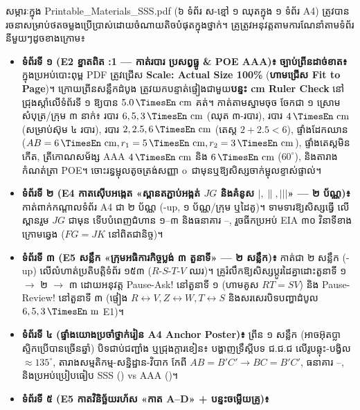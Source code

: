 \documentclass[a4paper,12pt]{article}
\newcommand{\en}[1]{{\TimesEn #1}}
\newcommand{\unit}[1]{\,\text{\en{#1}}}
\newcommand{\cnum}[1]{\text{\fontsize{10.5pt}{12pt}\selectfont\ding{\numexpr181+#1\relax}}}
\newcommand{\wcirc}{{\CourierBullet\fontsize{9.5pt}{11pt}\selectfont o}}
\begin{document}
សម្ភារៈក្នុង \en{Printable\_Materials\_SSS.pdf} (៦ ទំព័រ ស-ខ្មៅ ១ ឈុតក្នុង ១ ទំព័រ \en{A4}) ត្រូវបានរចនាសម្រាប់ថតចម្លងប្រើប្រាស់ដោយចំណាយតិចបំផុតក្នុងថ្នាក់។ គ្រូត្រូវអនុវត្តតាមការណែនាំតាមទំព័រនីមួយៗដូចខាងក្រោម៖

\begin{itemize}[leftmargin=0.55cm, topsep=1pt, itemsep=1.5pt, parsep=0pt]
  \item \textbf{ទំព័រទី ១ (\en{E2} ខ្នាតពិត \en{1:1} — កាត់របារ ប្រសព្វធ្នូ \& \en{POE AAA})៖}
    \textbf{ច្បាប់ព្រីនដាច់ខាត៖} ក្នុងប្រអប់បោះពុម្ព \en{PDF} ត្រូវជ្រើស \textbf{\en{Scale: Actual Size 100\%}} (\textbf{ហាមជ្រើស \en{Fit to Page}})។ ក្រោយព្រីនសន្លឹកដំបូង ត្រូវយកបន្ទាត់ផ្ទៀងជាមួយ\textbf{បន្ទះ \en{5 cm Ruler Check}} នៅជ្រុងស្ដាំលើទំព័រទី ១ ឱ្យបាន $5.0\unit{cm}$ គត់។ កាត់តាមស្នាមចុច  ចែកជា ១ ស្រោមសំបុត្រ/ក្រុម ៣ នាក់៖ របារ $6, 5, 3\unit{cm}$ (ឈុត ៣-របារ), របារ $4\unit{cm}$ (សម្រាប់ស៊ុម ៤ របារ), របារ $2, 2.5, 6\unit{cm}$ (តេស្ត $2+2.5<6$), ផ្ទាំងដែកឈាន ($AB=6\unit{cm}, r_1=5\unit{cm}, r_2=3\unit{cm}$), ផ្ទាំងតេស្តមិនកើត, ត្រីកោណសម័ង្ស \en{AAA} $4\unit{cm}$ និង $6\unit{cm}$ ($60^\circ$), និងតារាងកំណត់ត្រា \en{POE}។ ចោះរន្ធម្ជុលតូចត្រង់សញ្ញា \wcirc\ ជាមុនឬឱ្យសិស្សចាក់ម្ជុលខ្ទាស់ផ្ទាល់។
  \item \textbf{ទំព័រទី ២ (\en{E4} កាតស៊ើបអង្កេត «ស្ពានតភ្ជាប់អង្កត់ $JG$ និងគំនូស $|, \parallel, |||$» — ២ ប័ណ្ណ)៖}
    កាត់ពាក់កណ្ដាលទំព័រ \en{A4} ជា ២ ប័ណ្ណ (\en{2-up}, ១ ប័ណ្ណ/ក្រុម ឬដៃគូ)។ ទាមទារឱ្យសិស្សធ្វើ \en{[tracing]} លើស្ពានរួម $JG$ ជាមុន ទើបបំពេញជំហាន ១--៣ និងធនាគារ \cnum{1}--\cnum{5}, រួចធីកប្រអប់ \en{EIA} ៣០ វិនាទីខាងក្រោមឆ្វេង ($FG=JK$ នៅពិតជានិច្ច)។
  \item \textbf{ទំព័រទី ៣ (\en{E5} សន្លឹក «ក្រុមអធិការកិច្ចប្លង់ ៣ តួនាទី» — ២ សន្លឹក)៖}
    កាត់ជា ២ សន្លឹក (\en{2-up}) លើលំហាត់ប្រតិបត្តិទំព័រ ១៥៣ ($R\text{-}S\text{-}T\text{-}V$ ឈរ)។ គ្រូរំលឹកឱ្យសិស្សប្ដូរដៃគ្នាដោះតួនាទី ១ $\to$ ២ $\to$ ៣ ដោយអនុវត្ត \en{Pause-Ask!} នៅតួនាទី ១ (ហាមគូស $RT=SV$) និង \en{Pause-Review!} នៅតួនាទី ៣ (ផ្ទៀង $R\leftrightarrow V, Z\leftrightarrow W, T\leftrightarrow S$ និងសរសេរបិទបញ្ហាដំបូល $6, 5, 3\unit{m}$ \en{E1})។
  \item \textbf{ទំព័រទី ៤ (ផ្ទាំងយោងប្រចាំថ្នាក់រៀន \en{A4 Anchor Poster})៖}
    ព្រីន ១ សន្លឹក (អាចអ៊ុតប្លាស្ទិកប្រើបានច្រើនឆ្នាំ) បិទជាប់ជញ្ជាំង ឬជ្រុងក្ដារខៀន៖ បង្ហាញទ្រឹស្ដីបទ ជ.ជ.ជ លើរូបឆ្លុះ-បង្វិល $\approx 135^\circ$, តារាងសម្មតិកម្ម-សន្និដ្ឋាន-វិបាក កែពី $AB=B'C' \to BC=B'C'$, ធនាគារ \cnum{1}--\cnum{5}, និងប្រអប់ប្រៀបធៀប \en{SSS} () vs \en{AAA} ()។
  \item \textbf{ទំព័រទី ៥ (\en{E5} កាតវិនិច្ឆ័យរហ័ស «កាត \en{A--D}» + បន្ទះចម្លើយគ្រូ)៖}

\end{itemize}
\end{document}

